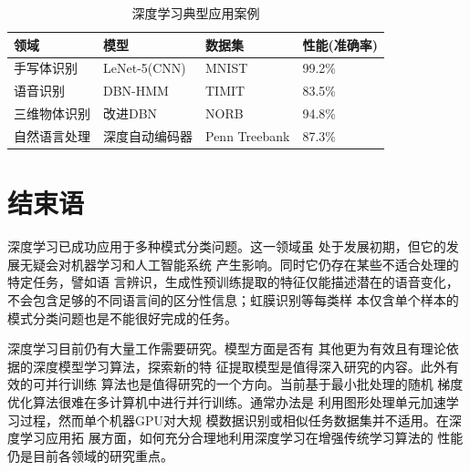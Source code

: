 \documentclass[UTF8]{article}
\begin{document}
	\begin{table}[H]
		\centering
		\label{tab:dl_app}
		\caption{深度学习典型应用案例}
		\begin{tabular}{llll}
			\toprule
			\textbf{领域}       & \textbf{模型}          & \textbf{数据集}           & \textbf{性能(准确率)}  \\ 
			\midrule
			手写体识别      & LeNet-5(CNN)        & MNIST                   & 99.2\%                 \\
			语音识别        & DBN-HMM              & TIMIT                   & 83.5\%                 \\
			三维物体识别    & 改进DBN              & NORB                    & 94.8\%                 \\
			自然语言处理    & 深度自动编码器       & Penn Treebank           & 87.3\%       \\
			\bottomrule
		\end{tabular}
	\end{table}
	
	\section{结束语}
	深度学习已成功应用于多种模式分类问题。这一领域虽
	处于发展初期，但它的发展无疑会对机器学习和人工智能系统
	产生影响。同时它仍存在某些不适合处理的特定任务，譬如语
	言辨识，生成性预训练提取的特征仅能描述潜在的语音变化，
	不会包含足够的不同语言间的区分性信息；虹膜识别等每类样
	本仅含单个样本的模式分类问题也是不能很好完成的任务。
	
	深度学习目前仍有大量工作需要研究。模型方面是否有
	其他更为有效且有理论依据的深度模型学习算法，探索新的特
	征提取模型是值得深入研究的内容。此外有效的可并行训练
	算法也是值得研究的一个方向。当前基于最小批处理的随机
	梯度优化算法很难在多计算机中进行并行训练。通常办法是
	利用图形处理单元加速学习过程，然而单个机器GPU对大规
	模数据识别或相似任务数据集并不适用。在深度学习应用拓
	展方面，如何充分合理地利用深度学习在增强传统学习算法的
	性能仍是目前各领域的研究重点。
    
    
    
     
    \clearpage
    
	\appendix
\end{document}

